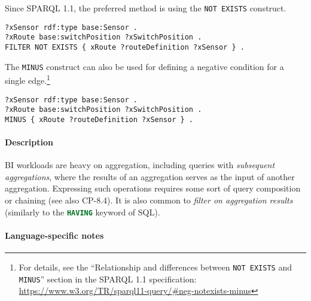 \begin{description}
Since SPARQL 1.1, the preferred method is using the \lstinline[language=sparql]{NOT EXISTS} construct.

\begin{minipage}{\linewidth}
\begin{lstlisting}[language=sparql]
?xSensor rdf:type base:Sensor .
?xRoute base:switchPosition ?xSwitchPosition .
FILTER NOT EXISTS { xRoute ?routeDefinition ?xSensor } .
\end{lstlisting}
\end{minipage}

The \lstinline{MINUS} construct can also be used for defining a negative condition for a single edge.\footnote{For details, see the ``Relationship and differences between \lstinline[language=sparql]{NOT EXISTS} and \lstinline[language=sparql]{MINUS}'' section in the SPARQL 1.1 specification: \url{https://www.w3.org/TR/sparql11-query/\#neg-notexists-minus}}

\begin{minipage}{\linewidth}
\begin{lstlisting}[language=sparql]
?xSensor rdf:type base:Sensor .
?xRoute base:switchPosition ?xSwitchPosition .
MINUS { xRoute ?routeDefinition ?xSensor } .
\end{lstlisting}
\end{minipage}

\end{description}






\paragraph{Description}

BI workloads are heavy on aggregation, including queries with \emph{subsequent
aggregations}, where the results of an aggregation serves as the input of
another aggregation. Expressing such operations requires some sort of query
composition or chaining (see also CP-8.4). It is also common to \emph{filter on
aggregation results} (similarly to the \lstinline[language=sql]{HAVING} keyword of SQL).

\paragraph{Language-specific notes}

